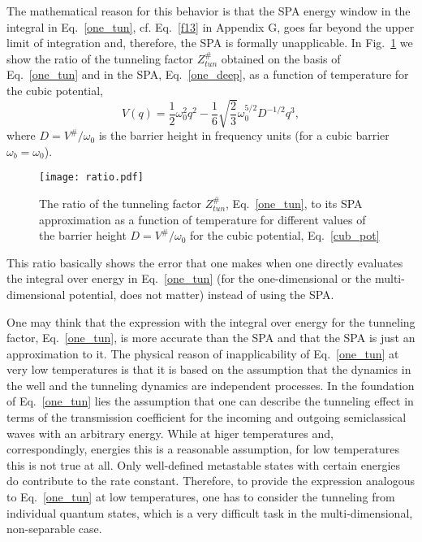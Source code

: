\documentclass[journal=jpcafh,manuscript=article]{achemso}
\begin{document}
The mathematical reason for this behavior is that the SPA energy
window in the integral in Eq.~\ref{one_tun}, cf. Eq.~\ref{f13} in
Appendix G, goes far beyond the upper limit of integration and,
therefore, the SPA is formally unapplicable.  In Fig.~\ref{fig_cub} we show
the ratio of the tunneling factor $Z^\#_{tun}$ obtained on the basis
of Eq.~\ref{one_tun} and in the SPA, Eq.~\ref{one_deep}, as a function of
temperature for the cubic potential,
\begin{equation}
  \label{cub_pot}
  V(q)=\frac{1}{2}\omega_0^2q^2-\frac{1}{6}\sqrt{\frac{2}{3}}\omega_0^{5/2}D^{-1/2}q^3,
\end{equation}
where $D=V^\#/\omega_0$ is the barrier height in frequency units (for
a cubic barrier $\omega_b=\omega_0$).
\begin{figure}[p]
\begin{center}
\texttt{[image: ratio.pdf]}
\caption{The ratio of the tunneling factor $Z^\#_{tun}$,
  Eq.~\ref{one_tun}, to its SPA approximation as a function of
  temperature for different values of the barrier height $D=V^\#/\omega_0$ for the
  cubic potential, Eq.~\ref{cub_pot}}
\label{fig_cub}
\end{center}
\end{figure}
This ratio basically shows the error that one makes when one directly
evaluates the integral over energy in Eq.~\ref{one_tun}
(for the one-dimensional or the multi-dimensional potential, does not
matter) instead of using the SPA.

One may think that the expression with the integral over energy for
the tunneling factor, Eq.~\ref{one_tun}, is more accurate than the SPA and
that the SPA is just an approximation to it.  The physical reason of
inapplicability of Eq.~\ref{one_tun} at very low temperatures is that
it is based on the assumption that the dynamics in the well and the
tunneling dynamics are independent processes. In the foundation of
Eq.~\ref{one_tun} lies the assumption that one can describe the
tunneling effect in terms of the transmission coefficient for the
incoming and outgoing semiclassical waves with an arbitrary
energy. While at higer temperatures and, correspondingly, energies
this is a reasonable assumption, for low temperatures this is not true
at all. Only well-defined metastable states with certain energies do
contribute to the rate constant. Therefore, to provide the expression
analogous to Eq.~\ref{one_tun} at low temperatures, one has to
consider the tunneling from individual quantum states, which is a very
difficult task in the multi-dimensional, non-separable case.
\end{document}
